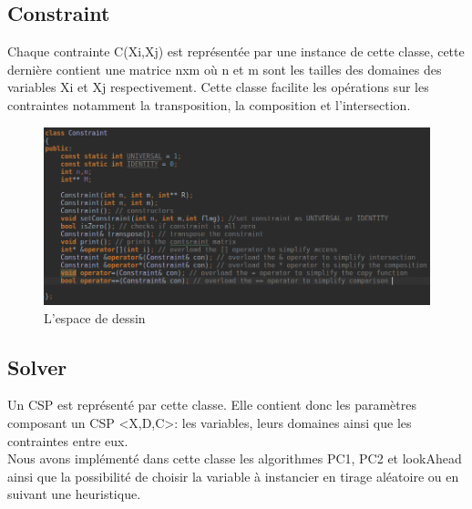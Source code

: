 \documentclass[12pt]{report}
\begin{document}
\subsection{Constraint}
Chaque contrainte C(Xi,Xj) est représentée par une instance de cette classe, cette dernière contient une matrice nxm où n et m sont les tailles des domaines des variables Xi et Xj respectivement. Cette classe facilite les opérations sur les contraintes notamment la transposition, la composition et l’intersection.
\begin{figure}[H]
	\centering
	\includegraphics[scale=0.55]{imgs/constraint.png}
	\caption{L'espace de dessin}
	\label{fig:Cons}
\end{figure}
\subsection{Solver}
Un CSP est représenté par cette classe. Elle contient donc les paramètres composant un CSP <X,D,C>: les variables, leurs domaines ainsi que les contraintes entre eux. \\
Nous avons implémenté dans cette classe les algorithmes PC1, PC2 et lookAhead ainsi que la possibilité de choisir la variable à instancier en tirage aléatoire ou en suivant une heuristique.
\end{document}
